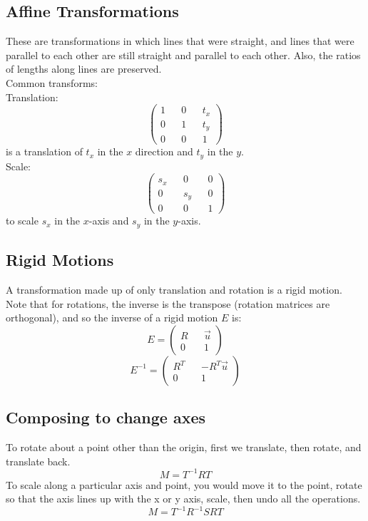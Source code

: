 \documentclass[12pt]{article}
\theoremstyle{definition}
\begin{document}
\subsection{Affine Transformations}
These are transformations in which lines that were straight, and lines that were parallel to each other are still straight and parallel to each other. Also, the ratios of lengths along lines are preserved.
\\ \linebreak
Common transforms:
\\ \linebreak
Translation:
$$\begin{pmatrix}
1 && 0 && t_x \\
0 && 1 && t_y \\
0 && 0 && 1
\end{pmatrix}$$
is a translation of $t_x$ in the $x$ direction and $t_y$ in the $y$.
\\ \linebreak
Scale:
$$\begin{pmatrix}
s_x && 0 && 0 \\
0 && s_y && 0 \\
0 && 0 && 1
\end{pmatrix}$$
to scale $s_x$ in the $x$-axis and $s_y$ in the $y$-axis.

\subsection{Rigid Motions}
A transformation made up of only translation and rotation is a rigid motion.
\\ \linebreak
Note that for rotations, the inverse is the transpose (rotation matrices are orthogonal), and so the inverse of a rigid motion $E$ is:
$$ E = \begin{pmatrix}
R && \vec{u} \\
0 && 1
\end{pmatrix}
$$
$$
E^{-1} = \begin{pmatrix}
R^T && -R^T \vec{u} \\
0 && 1
\end{pmatrix}
$$
\subsection{Composing to change axes}
To rotate about a point other than the origin, first we translate, then rotate, and translate back.
$$M = T^{-1}RT $$
To scale along a particular axis and point, you would move it to the point, rotate so that the axis lines up with the x or y axis, scale, then undo all the operations.
$$M = T^{-1}R^{-1}SRT$$
\end{document}
